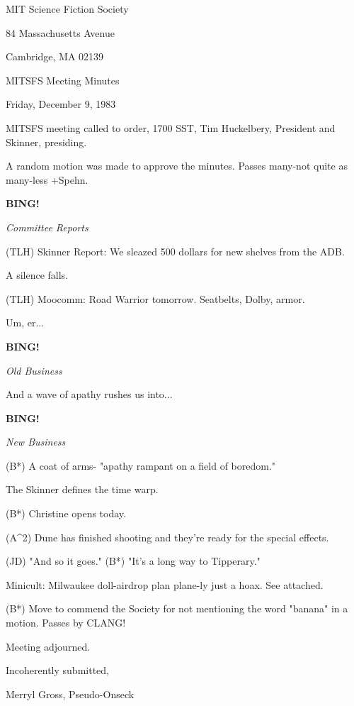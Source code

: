 \documentclass[12pt]{article}
\newcommand{\bing}{{\bf BING!} }
\newcommand{\goto}[1]{\bing \vskip 12pt \centerline{{\em{#1}}}}
\begin{document}
\begin{center}

MIT Science Fiction Society 

84 Massachusetts Avenue

Cambridge, MA 02139

\vspace{12pt}

MITSFS Meeting Minutes 

Friday, December 9, 1983

\end{center}
 
\vspace{18pt}

\setlength{\parskip}{6pt}

\noindent
MITSFS meeting called to order, 1700 SST,
Tim Huckelbery, President and Skinner, presiding.

A random motion was made to approve the minutes. Passes many-not quite as many-less +Spehn.

\goto{Committee Reports}

(TLH) Skinner Report: We sleazed 500 dollars for new shelves from the ADB.

A silence falls.

(TLH) Moocomm: Road Warrior tomorrow. Seatbelts, Dolby, armor.

Um, er...

\goto{Old Business}

And a wave of apathy rushes us into...

\goto{New Business}

(B*) A coat of arms- "apathy rampant on a field of boredom."

The Skinner defines the time warp.

(B*) Christine opens today.

(A^2) Dune has finished shooting and they're ready for the special effects.

(JD) "And so it goes." (B*) "It's a long way to Tipperary."

Minicult: Milwaukee doll-airdrop plan plane-ly just a hoax. See attached.

(B*) Move to commend the Society for not mentioning the word "banana" in a motion. Passes by CLANG!

\vspace{12pt}

\noindent
Meeting adjourned.

\vspace{18pt}

\centerline{Incoherently submitted,}
\centerline{Merryl Gross, Pseudo-Onseck}
\end{document}
